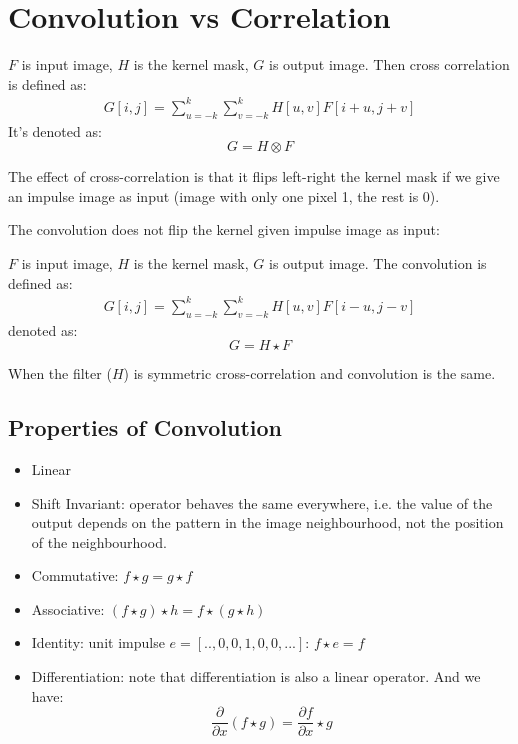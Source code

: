 \section{Convolution vs Correlation}
\begin{defi}
	$F$ is input image, $H$ is the kernel mask, $G$ is output image. Then cross correlation is defined as:
	\begin{align}
	G[i,j] = \sum_{u=-k}^{k}\sum_{v=-k}^{k} H[u,v]F[i+u, j+v]
	\end{align}
	It's denoted as:
	\[ G = H \otimes F\]
\end{defi}
The effect of cross-correlation is that it flips left-right the kernel mask if we give an impulse image as input (image with only one pixel 1, the rest is 0). 

The convolution does not flip the kernel given impulse image as input:
\begin{defi}[Convolution]
	$F$ is input image, $H$ is the kernel mask, $G$ is output image. The convolution is defined as:
	\begin{align}
	G[i,j] = \sum_{u=-k}^{k}\sum_{v=-k}^{k} H[u,v]F[i-u, j-v]
	\end{align}
	denoted as:
	\[G = H \star F \]
\end{defi}

When the filter ($H$) is symmetric cross-correlation and convolution is the same.

\subsection{Properties of Convolution}
\begin{itemize}
	\item Linear
	\item Shift Invariant: operator behaves the same everywhere, i.e. the value of the output depends on the pattern in the image neighbourhood, not the position of the neighbourhood.
	\item Commutative: $f \star g = g \star f$
	\item Associative: $(f \star g) \star h = f \star (g \star h)$
	\item Identity: unit impulse $e = [.., 0,0,1,0,0,...]$: $f \star e = f $
	\item Differentiation: note that differentiation is also a linear operator. And we have:
	$$ \frac{\partial}{\partial x}(f \star g) = \frac{\partial f}{\partial x} \star g $$
\end{itemize}


